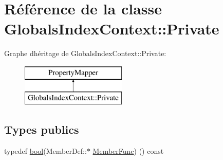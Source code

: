 \hypertarget{class_globals_index_context_1_1_private}{}\section{Référence de la classe Globals\+Index\+Context\+:\+:Private}
\label{class_globals_index_context_1_1_private}
Graphe d\textquotesingle{}héritage de Globals\+Index\+Context\+:\+:Private\+:\begin{figure}[H]
\begin{center}
\leavevmode
\includegraphics[height=2.000000cm]{class_globals_index_context_1_1_private}
\end{center}
\end{figure}
\subsection*{Types publics}
\begin{DoxyCompactItemize}
\item 
typedef \hyperlink{qglobal_8h_a1062901a7428fdd9c7f180f5e01ea056}{bool}(Member\+Def\+::$\ast$ \hyperlink{class_globals_index_context_1_1_private_a8d7afa38481f112522b6a0df12c98592}{Member\+Func}) () const 
\end{DoxyCompactItemize}
